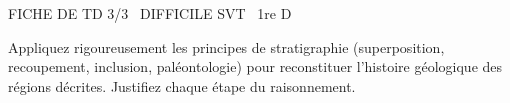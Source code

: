 \documentclass[11pt]{article}
\begin{document}
\begin{tcolorbox}[enhanced,colback=popink,colframe=popink,arc=10pt,boxrule=0pt,left=12pt,right=12pt,top=9pt,bottom=9pt]
{\color{white}\popxbold\small FICHE DE TD 3/3 \textbullet\ DIFFICILE \hfill SVT \textbullet\ 1re D\par}
\end{tcolorbox}
\vspace{4pt}
\noindent Appliquez rigoureusement les principes de stratigraphie (superposition, recoupement, inclusion, paléontologie) pour reconstituer l'histoire géologique des régions décrites. Justifiez chaque étape du raisonnement.
\end{document}
